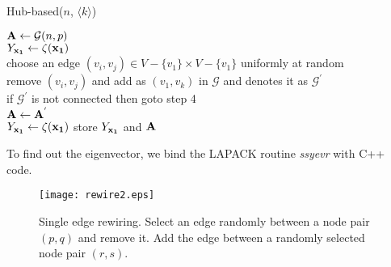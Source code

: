 \documentclass[envcountreset,oribibl]{llncs}
\begin{document}
\begin{algorithm}[thb]
\label{hub}
\caption{Hub-based($n$, $\langle k \rangle$)}
\Indp 
${\bf A} \leftarrow \mathcal{G}(n,p)$\\
$Y_{\bf x_1} \leftarrow \zeta(\bf x_1)$ \\ 
{
  choose an edge $(v_i,v_j) \in V-\{v_1\} \times V-\{v_1\}$ uniformly at random\\
  {
  remove $(v_i,v_j)$ and add as $(v_1,v_k)$ in $\mathcal{G}$ and denotes it as $\mathcal{G}^{'}$\\
  if $\mathcal{G^{'}}$ is not connected then goto step 4\\
  ${\bf A} \leftarrow {\bf A^{'}}$ \\
  $Y_{\bf x_1} \leftarrow \zeta(\bf x_1)$
  }
  store $Y_{\bf x_1}$ and ${\bf A}$
}
\Indm
\end{algorithm}
To find out the eigenvector, we bind the LAPACK routine \emph{ssyevr} with C++ code.
\begin{figure}[t]
\begin{center}
\texttt{[image: rewire2.eps]}
\caption{Single edge rewiring. Select an edge randomly between a node pair $(p,q)$ and remove it. Add the edge between a randomly selected node pair $(r,s)$.}
\label{rewire2}
\end{center}
\end{figure}
% 
%
%
%
\end{document}
